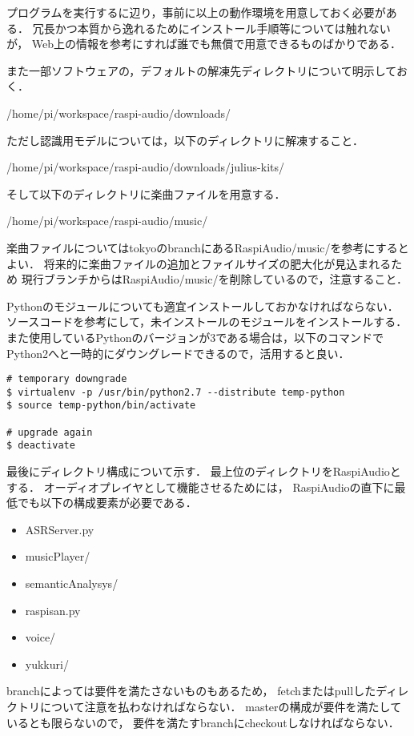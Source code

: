 \documentclass{jsarticle}
\begin{document}
\begin{multicols}{2}
プログラムを実行するに辺り，事前に以上の動作環境を用意しておく必要がある．
冗長かつ本質から逸れるためにインストール手順等については触れないが，
Web上の情報を参考にすれば誰でも無償で用意できるものばかりである．

また一部ソフトウェアの，デフォルトの解凍先ディレクトリについて明示しておく．
\begin{center}
/home/pi/workspace/raspi-audio/downloads/
\end{center}
ただし認識用モデルについては，以下のディレクトリに解凍すること．
\begin{center}
/home/pi/workspace/raspi-audio/downloads/julius-kits/
\end{center}

そして以下のディレクトリに楽曲ファイルを用意する．
\begin{center}
/home/pi/workspace/raspi-audio/music/
\end{center}
楽曲ファイルについてはtokyoのbranchにあるRaspiAudio/music/を参考にするとよい．
将来的に楽曲ファイルの追加とファイルサイズの肥大化が見込まれるため
現行ブランチからはRaspiAudio/music/を削除しているので，注意すること．

Pythonのモジュールについても適宜インストールしておかなければならない．
ソースコードを参考にして，未インストールのモジュールをインストールする．
また使用しているPythonのバージョンが3である場合は，以下のコマンドでPython2へと一時的にダウングレードできるので，活用すると良い．

\begin{lstlisting}[caption=/bin/sh]
# temporary downgrade
$ virtualenv -p /usr/bin/python2.7 --distribute temp-python
$ source temp-python/bin/activate

# upgrade again
$ deactivate
\end{lstlisting}

最後にディレクトリ構成について示す．
最上位のディレクトリをRaspiAudioとする．
オーディオプレイヤとして機能させるためには，
RaspiAudioの直下に最低でも以下の構成要素が必要である．
\begin{itemize}
\item ASRServer.py
\item musicPlayer/
\item semanticAnalysys/
\item raspisan.py
\item voice/
\item yukkuri/
\end{itemize}

branchによっては要件を満たさないものもあるため，
fetchまたはpullしたディレクトリについて注意を払わなければならない．
masterの構成が要件を満たしているとも限らないので，
要件を満たすbranchにcheckoutしなければならない．


\end{multicols}
\end{document}

